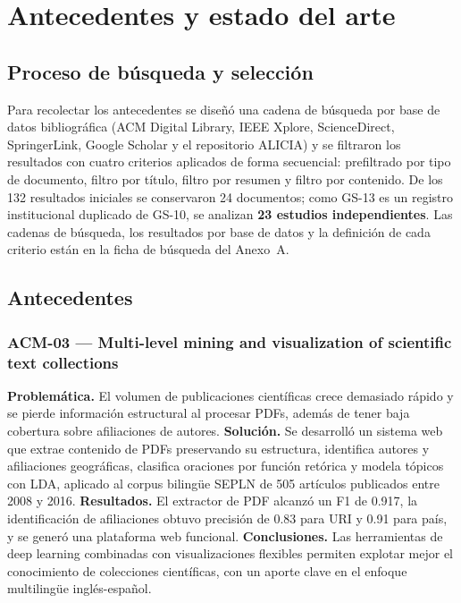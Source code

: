 \section{Antecedentes y estado del arte}

\subsection{Proceso de búsqueda y selección}

Para recolectar los antecedentes se diseñó una cadena de búsqueda por base de datos bibliográfica (ACM Digital Library, IEEE Xplore, ScienceDirect, SpringerLink, Google Scholar y el repositorio ALICIA) y se filtraron los resultados con cuatro criterios aplicados de forma secuencial: prefiltrado por tipo de documento, filtro por título, filtro por resumen y filtro por contenido. De los 132 resultados iniciales se conservaron 24 documentos; como GS-13 es un registro institucional duplicado de GS-10, se analizan \textbf{23 estudios independientes}. Las cadenas de búsqueda, los resultados por base de datos y la definición de cada criterio están en la ficha de búsqueda del Anexo~A.

\subsection{Antecedentes}

\subsubsection*{ACM-03 --- Multi-level mining and visualization of scientific text collections \cite{ref4}}

\textbf{Problemática.} El volumen de publicaciones científicas crece demasiado rápido y se pierde información estructural al procesar PDFs, además de tener baja cobertura sobre afiliaciones de autores. \textbf{Solución.} Se desarrolló un sistema web que extrae contenido de PDFs preservando su estructura, identifica autores y afiliaciones geográficas, clasifica oraciones por función retórica y modela tópicos con LDA, aplicado al corpus bilingüe SEPLN de 505 artículos publicados entre 2008 y 2016. \textbf{Resultados.} El extractor de PDF alcanzó un F1 de 0.917, la identificación de afiliaciones obtuvo precisión de 0.83 para URI y 0.91 para país, y se generó una plataforma web funcional. \textbf{Conclusiones.} Las herramientas de deep learning combinadas con visualizaciones flexibles permiten explotar mejor el conocimiento de colecciones científicas, con un aporte clave en el enfoque multilingüe inglés-español.

